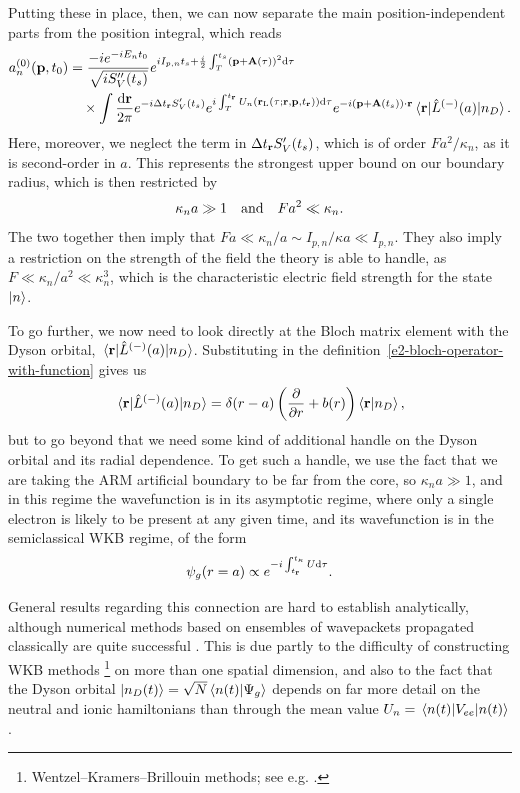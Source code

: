 Putting these in place, then, we can now separate the main position-independent parts from the position integral, which reads
\begin{align}
a_n^{(0)}(\vb{p},\tn)
& =
\frac{-i e^{-iE_n\tn}}{\sqrt{iS_V''(\ts)}}
e^{iI_{p,n} \ts + \frac{i}{2} \int_T^{\ts}\left(\vbp+\vba(\tau)\right)^2\d\tau }
\nonumber \\ & \quad \times
\int\frac{\d\vbr}{2\pi}
e^{-i \Delta\tvr S_V'(\ts)}
e^{i\int_T^{\tvr} U_n(\rl(\tau;\vb{r},\vbp,\tvr))\d\tau}
e^{-i\left(\vbp+\vba(\ts)\right)\cdot\vb{r}}
\matrixel{\vbr}{\hat{L}^{(-)}(a)}{n_D}
.
\label{e2-yield-after-rearrangement}
\end{align}
Here, moreover, we neglect the term  in $\Delta{t_{\ensuremath{\vb{r}}}} S_V'({t_s})$, which is of order $Fa^2/\kappa_n$, as it is second-order in $a$. This represents the strongest upper bound on our boundary radius, which is then restricted by
\begin{equation}
\kappa_n a \gg 1
\qq{and}
Fa^2\ll \kappa_n.
\end{equation}
The two together then imply that $Fa \ll \kappa_n/a \sim I_{p,n}/\kappa a \ll I_{p,n}$. They also imply a restriction on the strength of the field the theory is able to handle, as $F \ll \kappa_n/a^2 \ll \kappa_n^3$, which is the characteristic electric field strength for the state $\ket{n}$.


To go further, we now need to look directly at the Bloch matrix element with the Dyson orbital, $\matrixel{\vbr}{\hat{L}^{(-)}(a)}{n_D}$. Substituting in the definition~\eqref{e2-bloch-operator-with-function} gives us 
\begin{equation}
\matrixel{\vbr}{\hat{L}^{(-)}(a)}{n_D}
=
\delta(r-a)\left( \frac{\partial}{\partial r} + b(r) \right)
\braket{\vbr}{n_D},
\end{equation}
but to go beyond that we need some kind of additional handle on the Dyson orbital and its radial dependence. To get such a handle, we use the fact that we are taking the ARM artificial boundary to be far from the core, so $\kappa_n a \gg 1$, and in this regime the wavefunction is in its asymptotic regime, where only a single electron is likely to be present at any given time, and its wavefunction is in the semiclassical WKB regime, of the form
\begin{equation}
\psi_g(r=a) \propto e^{-i\int_{{t_{\vb{r}}}}^{{t_\kappa}}U\mathrm{d}\tau}.
\label{e2-ground-state-WKB-dependence}
\end{equation}



General results regarding this connection are hard to establish analytically, although numerical methods based on ensembles of wavepackets propagated classically are quite successful \cite{Tannor_time_dependent_QM}. This is due partly to the difficulty of constructing WKB methods%
\footnote{Wentzel–Kramers–Brillouin methods; see e.g. .}
on more than one spatial dimension, and also to the fact that the Dyson orbital $\ket{n_D(t)}=\sqrt{N}\braket{n(t)}{\Psi_g}$ depends on far more detail on the neutral and ionic hamiltonians than through the mean value $U_n=\matrixel{n(t)}{V_{ee}}{n(t)}$. 

